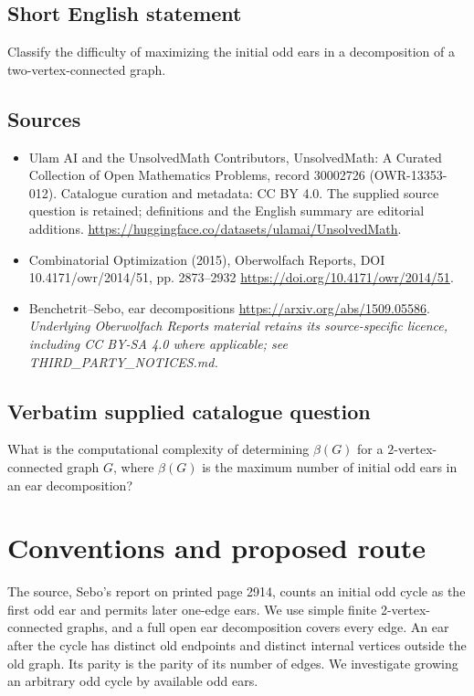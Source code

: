 \documentclass[11pt]{article}
\begin{document}
\subsection{Short English statement}
Classify the difficulty of maximizing the initial odd ears in a decomposition of a two-vertex-connected graph.
\subsection{Sources}
\begin{itemize}
\item[S1] Ulam AI and the UnsolvedMath Contributors, UnsolvedMath: A Curated Collection of Open Mathematics Problems, record 30002726 (OWR-13353-012). Catalogue curation and metadata: CC BY 4.0. The supplied source question is retained; definitions and the English summary are editorial additions.
\url{https://huggingface.co/datasets/ulamai/UnsolvedMath}.
\item[S2] Combinatorial Optimization (2015), Oberwolfach Reports, DOI 10.4171/owr/2014/51, pp. 2873--2932
\url{https://doi.org/10.4171/owr/2014/51}.
\item[S3] Benchetrit--Sebo, ear decompositions
\url{https://arxiv.org/abs/1509.05586}.
\textit{Underlying Oberwolfach Reports material retains its source-specific licence, including CC BY-SA 4.0 where applicable; see THIRD\_PARTY\_NOTICES.md.}
\end{itemize}
\subsection{Verbatim supplied catalogue question}
What is the computational complexity of determining $\beta(G)$ for a $2$-vertex-connected graph $G$, where $\beta(G)$ is the maximum number of initial odd ears in an ear decomposition?

\section{Conventions and proposed route}
The source, Sebo's report on printed page 2914, counts an initial odd cycle
as the first odd ear and permits later one-edge ears. We use simple finite
2-vertex-connected graphs, and a full open ear decomposition covers every edge.
An ear after the cycle has distinct old endpoints and distinct internal vertices
outside the old graph. Its parity is the parity of its number of edges.
We investigate growing an arbitrary odd cycle by available odd ears.
\end{document}
